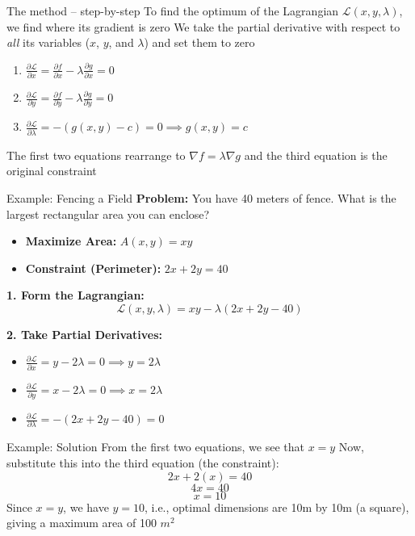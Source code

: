 \documentclass[aspectratio=169]{beamer}\usepackage[]{graphicx}\usepackage[]{xcolor}
\begin{document}
\begin{frame}{The method -- step-by-step}
  To find the optimum of the Lagrangian $\mathcal{L}(x, y, \lambda)$, we find where its gradient is zero
  \vfill
  We take the partial derivative with respect to \textit{all} its variables ($x$, $y$, and $\lambda$) and set them to zero
  \vfill
  \begin{enumerate}
    \item $\frac{\partial \mathcal{L}}{\partial x} = \frac{\partial f}{\partial x} - \lambda \frac{\partial g}{\partial x} = 0$
    \item $\frac{\partial \mathcal{L}}{\partial y} = \frac{\partial f}{\partial y} - \lambda \frac{\partial g}{\partial y} = 0$
    \item $\frac{\partial \mathcal{L}}{\partial \lambda} = -(g(x, y) - c) = 0 \implies g(x, y) = c$
  \end{enumerate}
  \vfill
  The first two equations rearrange to $\nabla f = \lambda \nabla g$ and the third equation is the original constraint
\end{frame}

\begin{frame}{Example: Fencing a Field}
  \textbf{Problem:} You have 40 meters of fence. What is the largest rectangular area you can enclose?
  
  \begin{itemize}
    \item \textbf{Maximize Area:} $A(x, y) = xy$
    \item \textbf{Constraint (Perimeter):} $2x + 2y = 40$
  \end{itemize}
  
  \textbf{1. Form the Lagrangian:}
  $$ \mathcal{L}(x, y, \lambda) = xy - \lambda(2x + 2y - 40) $$
  
  \textbf{2. Take Partial Derivatives:}
  \begin{itemize}
    \item $\frac{\partial \mathcal{L}}{\partial x} = y - 2\lambda = 0 \implies y = 2\lambda$
    \item $\frac{\partial \mathcal{L}}{\partial y} = x - 2\lambda = 0 \implies x = 2\lambda$
    \item $\frac{\partial \mathcal{L}}{\partial \lambda} = -(2x + 2y - 40) = 0$
  \end{itemize}
\end{frame}

\begin{frame}{Example: Solution}
  From the first two equations, we see that $x = y$
  \vfill
  Now, substitute this into the third equation (the constraint):
  $$ 2x + 2(x) = 40 $$
  $$ 4x = 40 $$
  $$ x = 10 $$
  \vfill
  Since $x=y$, we have $y=10$, i.e., optimal dimensions are 10m by 10m (a square), giving a maximum area of 100 $m^2$
\end{frame}
\end{document}
